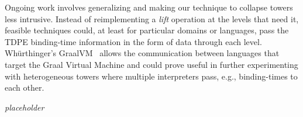 \documentclass[sigplan,anonymous,review]{acmart}
\newcommand{\mevl}{$M_{e}$}
\theoremstyle{definition}
\begin{document}


Ongoing work involves generalizing and making our technique to collapse towers less intrusive. Instead of reimplementing a \textit{lift} operation at the levels that need it, feasible techniques could, at least for particular domains or languages, pass the TDPE binding-time information in the form of data through each level. Wh{\"u}rthinger's GraalVM~\cite{wurthinger2013one} allows the communication between languages that target the Graal Virtual Machine and could prove useful in further experimenting with heterogeneous towers where multiple interpreters pass, e.g., binding-times to each other.

\begin{acks}
\textit{placeholder}
\end{acks}




\end{document}
